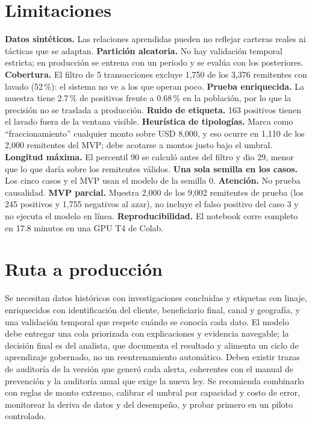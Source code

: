 \documentclass[11pt,a4paper]{article}
\begin{document}
\section{Limitaciones}
\textbf{Datos sintéticos.} Las relaciones aprendidas pueden no reflejar carteras reales ni tácticas que se adaptan. \textbf{Partición aleatoria.} No hay validación temporal estricta; en producción se entrena con un periodo y se evalúa con los posteriores. \textbf{Cobertura.} El filtro de 5 transacciones excluye 1,750 de los 3,376 remitentes con lavado (52\,\%): el sistema no ve a los que operan poco. \textbf{Prueba enriquecida.} La muestra tiene 2.7\,\% de positivos frente a 0.68\,\% en la población, por lo que la precisión no se traslada a producción. \textbf{Ruido de etiqueta.} 163 positivos tienen el lavado fuera de la ventana visible. \textbf{Heurística de tipologías.} Marca como ``fraccionamiento'' cualquier monto sobre USD 8,000, y eso ocurre en 1,110 de los 2,000 remitentes del MVP; debe acotarse a montos justo bajo el umbral. \textbf{Longitud máxima.} El percentil 90 se calculó antes del filtro y dio 29, menor que lo que daría sobre los remitentes válidos. \textbf{Una sola semilla en los casos.} Los cinco casos y el MVP usan el modelo de la semilla 0. \textbf{Atención.} No prueba causalidad. \textbf{MVP parcial.} Muestra 2,000 de los 9,002 remitentes de prueba (los 245 positivos y 1,755 negativos al azar), no incluye el falso positivo del caso 3 y no ejecuta el modelo en línea. \textbf{Reproducibilidad.} El notebook corre completo en 17.8 minutos en una GPU T4 de Colab.

\section{Ruta a producción}
Se necesitan datos históricos con investigaciones concluidas y etiquetas con linaje, enriquecidos con identificación del cliente, beneficiario final, canal y geografía, y una validación temporal que respete cuándo se conocía cada dato. El modelo debe entregar una cola priorizada con explicaciones y evidencia navegable; la decisión final es del analista, que documenta el resultado y alimenta un ciclo de aprendizaje gobernado, no un reentrenamiento automático. Deben existir trazas de auditoría de la versión que generó cada alerta, coherentes con el manual de prevención y la auditoría anual que exige la nueva ley. Se recomienda combinarlo con reglas de monto extremo, calibrar el umbral por capacidad y costo de error, monitorear la deriva de datos y del desempeño, y probar primero en un piloto controlado.
\end{document}
